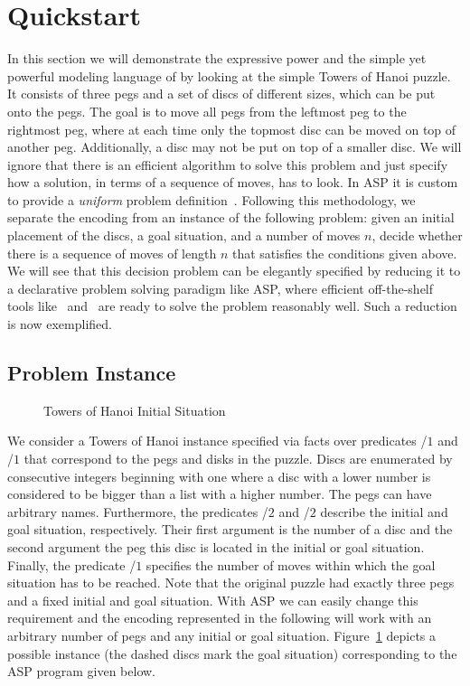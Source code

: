 %
\section{Quickstart}\label{sec:quickstart}
In this section we will demonstrate the expressive power 
and the simple yet powerful modeling language of \gringo{}
by looking at the simple Towers of Hanoi puzzle.
It consists of three pegs and a set of discs of different sizes, 
which can be put onto the pegs. 
The goal is to move all pegs from the leftmost peg to the rightmost peg,
where at each time only the topmost disc can be moved on top of another peg.
Additionally, a disc may not be put on top of a smaller disc.
We will ignore that there is an efficient algorithm to solve this problem 
and just specify how a solution, in terms of a sequence of moves, has to look.
In ASP it is custom to provide a \emph{uniform}
problem definition~\cite{martru99a,niemela99a,schlipf95a}.
Following this methodology, we separate the encoding
from an instance of the following problem:
given an initial placement of the discs, a goal situation, and a number of moves $n$,
decide whether there is a sequence of moves of length $n$ 
that satisfies the conditions given above.
We will see that this decision problem can be elegantly 
specified by reducing it to a declarative problem solving paradigm like ASP,
where efficient off-the-shelf tools like \gringo\ and \clasp\
are ready to solve the problem reasonably well.
Such a reduction is now exemplified.

\subsection{Problem Instance}

\begin{figure}[tb]
\centering
\hanoiInstance
\caption{Towers of Hanoi Initial Situation\label{fig:toh_inst}}
\end{figure}

We consider a Towers of Hanoi instance specified via facts over predicates
\pred{peg}/$1$ and \pred{disk}/$1$ that correspond to the pegs and disks in the puzzle.
Discs are enumerated by consecutive integers beginning with one
where a disc with a lower number is considered to be bigger than a list with a higher number.
The pegs can have arbitrary names. 
Furthermore, the predicates /$2$ and /$2$ describe the initial and goal situation, respectively.
Their first argument is the number of a disc and the second argument the peg 
this disc is located in the initial or goal situation.
Finally, the predicate /$1$ specifies the number of moves within which the goal situation has to be reached.
Note that the original puzzle had exactly three pegs and a fixed initial and goal situation.
With ASP we can easily change this requirement and 
the encoding represented in the following will work with an arbitrary number of pegs and any initial or goal situation.
Figure~\ref{fig:toh_inst} depicts a possible instance (the dashed discs mark the goal situation) 
corresponding to the ASP program given below.

